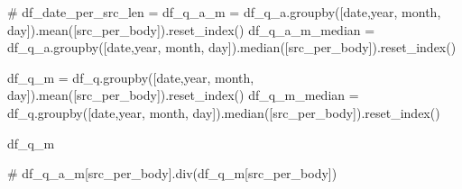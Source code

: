 \documentclass[
  letterpaper,
  DIV=11,
  numbers=noendperiod]{scrartcl}
\newenvironment{Shaded}{\begin{snugshade}}{\end{snugshade}}
\newcommand{\CommentTok}[1]{\textcolor[rgb]{0.37,0.37,0.37}{#1}}
\newcommand{\NormalTok}[1]{\textcolor[rgb]{0.00,0.23,0.31}{#1}}
\newcommand{\OperatorTok}[1]{\textcolor[rgb]{0.37,0.37,0.37}{#1}}
\newcommand{\StringTok}[1]{\textcolor[rgb]{0.13,0.47,0.30}{#1}}
\begin{document}
\begin{Shaded}
\begin{Highlighting}[]
\CommentTok{\# df\_date\_per\_src\_len = }
\NormalTok{df\_q\_a\_m }\OperatorTok{=}\NormalTok{ df\_q\_a.groupby([}\StringTok{\textquotesingle{}date\textquotesingle{}}\NormalTok{,}\StringTok{\textquotesingle{}year\textquotesingle{}}\NormalTok{, }\StringTok{\textquotesingle{}month\textquotesingle{}}\NormalTok{, }\StringTok{\textquotesingle{}day\textquotesingle{}}\NormalTok{]).mean([}\StringTok{\textquotesingle{}src\_per\_body\textquotesingle{}}\NormalTok{]).reset\_index()}
\NormalTok{df\_q\_a\_m\_median }\OperatorTok{=}\NormalTok{ df\_q\_a.groupby([}\StringTok{\textquotesingle{}date\textquotesingle{}}\NormalTok{,}\StringTok{\textquotesingle{}year\textquotesingle{}}\NormalTok{, }\StringTok{\textquotesingle{}month\textquotesingle{}}\NormalTok{, }\StringTok{\textquotesingle{}day\textquotesingle{}}\NormalTok{]).median([}\StringTok{\textquotesingle{}src\_per\_body\textquotesingle{}}\NormalTok{]).reset\_index()}

\NormalTok{df\_q\_m }\OperatorTok{=}\NormalTok{ df\_q.groupby([}\StringTok{\textquotesingle{}date\textquotesingle{}}\NormalTok{,}\StringTok{\textquotesingle{}year\textquotesingle{}}\NormalTok{, }\StringTok{\textquotesingle{}month\textquotesingle{}}\NormalTok{, }\StringTok{\textquotesingle{}day\textquotesingle{}}\NormalTok{]).mean([}\StringTok{\textquotesingle{}src\_per\_body\textquotesingle{}}\NormalTok{]).reset\_index()}
\NormalTok{df\_q\_m\_median }\OperatorTok{=}\NormalTok{ df\_q.groupby([}\StringTok{\textquotesingle{}date\textquotesingle{}}\NormalTok{,}\StringTok{\textquotesingle{}year\textquotesingle{}}\NormalTok{, }\StringTok{\textquotesingle{}month\textquotesingle{}}\NormalTok{, }\StringTok{\textquotesingle{}day\textquotesingle{}}\NormalTok{]).median([}\StringTok{\textquotesingle{}src\_per\_body\textquotesingle{}}\NormalTok{]).reset\_index()}
\end{Highlighting}
\end{Shaded}

\begin{Shaded}
\begin{Highlighting}[]
\NormalTok{df\_q\_m}
\end{Highlighting}
\end{Shaded}

\begin{Shaded}
\begin{Highlighting}[]
\CommentTok{\# df\_q\_a\_m[\textquotesingle{}src\_per\_body\textquotesingle{}].div(df\_q\_m[\textquotesingle{}src\_per\_body\textquotesingle{}])}
\end{Highlighting}
\end{Shaded}
\end{document}
